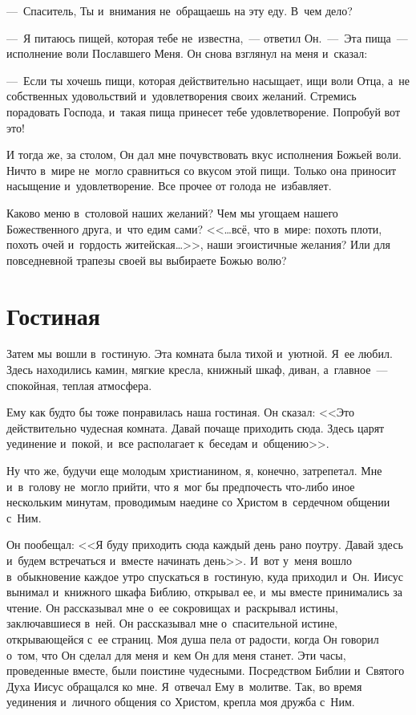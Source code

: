 \documentclass[12pt,article,a4paper,fittopage]{ncc}
\begin{document}
\begin{multicols}{2}
---~Спаситель, Ты и~внимания не~обращаешь на эту еду. В~чем дело?

---~Я питаюсь пищей, которая тебе не~известна,~--- ответил Он.~---~Эта пища~--- исполнение воли Пославшего Меня. Он снова взглянул на меня и~сказал: 

---~Если ты хочешь пищи, которая действительно насыщает, ищи воли Отца, а~не собственных удовольствий и~удовлетворения своих желаний. Стремись порадовать Господа, и~такая пища принесет тебе удовлетворение. Попробуй вот это!

И тогда же, за столом, Он дал мне почувствовать вкус исполнения Божьей воли. Ничто в~мире не~могло сравниться со вкусом этой пищи. Только она приносит насыщение и~удовлетворение. Все прочее от голода не~избавляет.

Каково меню в~столовой наших желаний? Чем мы угощаем нашего Божественного друга, и~что едим сами? <<\ldots{}всё, что в~мире: похоть плоти, похоть очей и~гордость житейская\ldots{}>>, наши эгоистичные желания? Или для повседневной трапезы своей вы выбираете Божью волю?

\section*{Гостиная}

Затем мы вошли в~гостиную. Эта комната была тихой и~уютной. Я~ее любил. Здесь находились камин, мягкие кресла, книжный шкаф, диван, а~главное~--- спокойная, теплая атмосфера. 

Ему как будто бы тоже понравилась наша гостиная. Он сказал: <<Это действительно чудесная комната. Давай почаще приходить сюда. Здесь царят уединение и~покой, и~все располагает к~беседам и~общению>>.

Ну что же, будучи еще молодым христианином, я, конечно, затрепетал. Мне и~в~голову не~могло прийти, что я~мог бы предпочесть что-либо иное нескольким минутам, проводимым наедине со Христом в~сердечном общении с~Ним. 

Он пообещал: <<Я буду приходить сюда каждый день рано поутру. Давай здесь и~будем встречаться и~вместе начинать день>>. И~вот у~меня вошло в~обыкновение каждое утро спускаться в~гостиную, куда приходил и~Он. Иисус вынимал и~книжного шкафа Библию, открывал ее, и~мы вместе принимались за чтение. Он рассказывал мне о~ее сокровищах и~раскрывал истины, заключавшиеся в~ней. Он рассказывал мне о~спасительной истине, открывающейся с~ее страниц. Моя душа пела от радости, когда Он говорил о~том, что Он сделал для меня и~кем Он для меня станет. Эти часы, проведенные вместе, были поистине чудесными. Посредством Библии и~Святого Духа Иисус обращался ко мне. Я~отвечал Ему в~молитве. Так, во время уединения и~личного общения со Христом, крепла моя дружба с~Ним.


\end{multicols}
\end{document}
